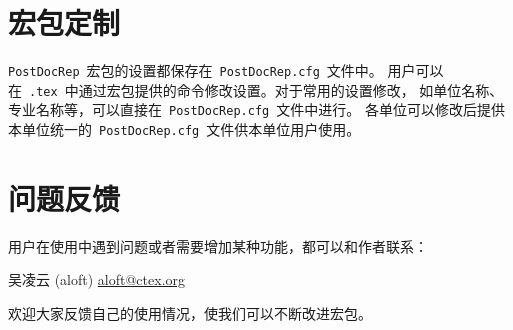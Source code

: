 \section{宏包定制}

\texttt{PostDocRep}~宏包的设置都保存在~\texttt{PostDocRep.cfg}~文件中。
用户可以在~\texttt{.tex}~中通过宏包提供的命令修改设置。对于常用的设置修改，
如单位名称、专业名称等，可以直接在~\texttt{PostDocRep.cfg}~文件中进行。
各单位可以修改后提供本单位统一的~\texttt{PostDocRep.cfg}~文件供本单位用户使用。

\section{问题反馈}

用户在使用中遇到问题或者需要增加某种功能，都可以和作者联系：

\begin{center}
吴凌云 (aloft) \quad \href{mailto:aloft@ctex.org}{aloft@ctex.org}
\end{center}

欢迎大家反馈自己的使用情况，使我们可以不断改进宏包。
